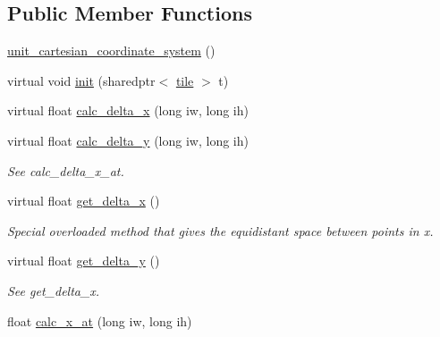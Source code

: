 \subsection*{Public Member Functions}
\begin{DoxyCompactItemize}
\item 
\hyperlink{classunit__cartesian__coordinate__system_a0a471305ff0743a900c9c270e52bd243}{unit\-\_\-cartesian\-\_\-coordinate\-\_\-system} ()
\item 
virtual void \hyperlink{classunit__cartesian__coordinate__system_a96d70a42cec4279c1320995e770c3fe5}{init} (sharedptr$<$ \hyperlink{classtile}{tile} $>$ t)
\item 
virtual float \hyperlink{classunit__cartesian__coordinate__system_a9093a6700e1a34f6dfb127358973c8c5}{calc\-\_\-delta\-\_\-x} (long iw, long ih)
\item 
\hypertarget{classunit__cartesian__coordinate__system_aa9cd14787ed2ca759ee7552dc799b9ba}{virtual float \hyperlink{classunit__cartesian__coordinate__system_aa9cd14787ed2ca759ee7552dc799b9ba}{calc\-\_\-delta\-\_\-y} (long iw, long ih)}\label{classunit__cartesian__coordinate__system_aa9cd14787ed2ca759ee7552dc799b9ba}

\begin{DoxyCompactList}\small\item\em See calc\-\_\-delta\-\_\-x\-\_\-at. \end{DoxyCompactList}\item 
\hypertarget{classunit__cartesian__coordinate__system_aeae04db199b3e27c57f955bccf8c3155}{virtual float \hyperlink{classunit__cartesian__coordinate__system_aeae04db199b3e27c57f955bccf8c3155}{get\-\_\-delta\-\_\-x} ()}\label{classunit__cartesian__coordinate__system_aeae04db199b3e27c57f955bccf8c3155}

\begin{DoxyCompactList}\small\item\em Special overloaded method that gives the equidistant space between points in x. \end{DoxyCompactList}\item 
\hypertarget{classunit__cartesian__coordinate__system_a8b6ec8c5b8230d1fcc79f9e9f1c365f1}{virtual float \hyperlink{classunit__cartesian__coordinate__system_a8b6ec8c5b8230d1fcc79f9e9f1c365f1}{get\-\_\-delta\-\_\-y} ()}\label{classunit__cartesian__coordinate__system_a8b6ec8c5b8230d1fcc79f9e9f1c365f1}

\begin{DoxyCompactList}\small\item\em See get\-\_\-delta\-\_\-x. \end{DoxyCompactList}\item 
\hypertarget{classunit__cartesian__coordinate__system_a765716f6eeb58e5340139f220f8e4649}{float \hyperlink{classunit__cartesian__coordinate__system_a765716f6eeb58e5340139f220f8e4649}{calc\-\_\-x\-\_\-at} (long iw, long ih)}\label{classunit__cartesian__coordinate__system_a765716f6eeb58e5340139f220f8e4649}


\end{DoxyCompactItemize}
